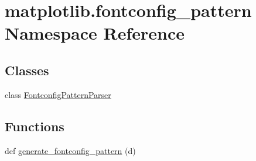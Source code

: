 \hypertarget{namespacematplotlib_1_1fontconfig__pattern}{}\section{matplotlib.\+fontconfig\+\_\+pattern Namespace Reference}
\label{namespacematplotlib_1_1fontconfig__pattern}
\subsection*{Classes}
\begin{DoxyCompactItemize}
\item 
class \hyperlink{classmatplotlib_1_1fontconfig__pattern_1_1FontconfigPatternParser}{Fontconfig\+Pattern\+Parser}
\end{DoxyCompactItemize}
\subsection*{Functions}
\begin{DoxyCompactItemize}
\item 
def \hyperlink{namespacematplotlib_1_1fontconfig__pattern_a5cdabe2597ceb298395ca891b2ee7935}{generate\+\_\+fontconfig\+\_\+pattern} (d)
\end{DoxyCompactItemize}
